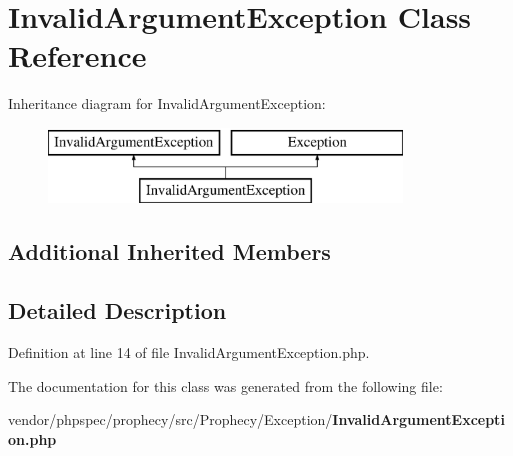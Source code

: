 \section{Invalid\+Argument\+Exception Class Reference}
\label{class_prophecy_1_1_exception_1_1_invalid_argument_exception}
Inheritance diagram for Invalid\+Argument\+Exception\+:\begin{figure}[H]
\begin{center}
\leavevmode
\includegraphics[height=2.000000cm]{class_prophecy_1_1_exception_1_1_invalid_argument_exception}
\end{center}
\end{figure}
\subsection*{Additional Inherited Members}


\subsection{Detailed Description}


Definition at line 14 of file Invalid\+Argument\+Exception.\+php.



The documentation for this class was generated from the following file\+:\begin{DoxyCompactItemize}
\item 
vendor/phpspec/prophecy/src/\+Prophecy/\+Exception/{\bf Invalid\+Argument\+Exception.\+php}\end{DoxyCompactItemize}
